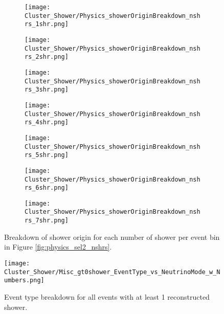 \begin{figure}[t!]
\centering
  \begin{subfigure}[t]{0.25\textwidth}
    \centering
\texttt{[image: Cluster\_Shower/Physics\_showerOriginBreakdown\_nshrs\_1shr.png]}
  \caption{ }
  \end{subfigure} 
  \hspace{4mm}
  \begin{subfigure}[t]{0.25\textwidth}
    \centering
\texttt{[image: Cluster\_Shower/Physics\_showerOriginBreakdown\_nshrs\_2shr.png]}
  \caption{ }
  \end{subfigure} 
  \hspace{4mm}
  \begin{subfigure}[t]{0.25\textwidth}
    \centering
\texttt{[image: Cluster\_Shower/Physics\_showerOriginBreakdown\_nshrs\_3shr.png]}
  \caption{ }
  \end{subfigure} 
  \hspace{4mm}
  \begin{subfigure}[t]{0.25\textwidth}
    \centering
\texttt{[image: Cluster\_Shower/Physics\_showerOriginBreakdown\_nshrs\_4shr.png]}
  \caption{ }
  \end{subfigure} 
  \hspace{4mm}
  \begin{subfigure}[t]{0.25\textwidth}
    \centering
\texttt{[image: Cluster\_Shower/Physics\_showerOriginBreakdown\_nshrs\_5shr.png]}
  \caption{ }
  \end{subfigure} 
  \hspace{4mm}
  \begin{subfigure}[t]{0.25\textwidth}
    \centering
\texttt{[image: Cluster\_Shower/Physics\_showerOriginBreakdown\_nshrs\_6shr.png]}
  \caption{ }
  \end{subfigure} 
  \hspace{4mm}
  \begin{subfigure}[t]{0.25\textwidth}
    \centering
\texttt{[image: Cluster\_Shower/Physics\_showerOriginBreakdown\_nshrs\_7shr.png]}
  \caption{ }
  \end{subfigure} 
\caption{ Breakdown of shower origin for each number of shower per event bin in Figure \ref{fig:physics_sel2_nshrs}. }
\label{fig:physics_sel2_nshr_background_breakdown}
\end{figure}

\begin{figure}[h!]
\centering
\texttt{[image: Cluster\_Shower/Misc\_gt0shower\_EventType\_vs\_NeutrinoMode\_w\_Numbers.png]}
\caption{ Event type breakdown for all events with at least 1 reconstructed shower. }
\label{fig:physics_gt0shower_eventtype}
\end{figure}

